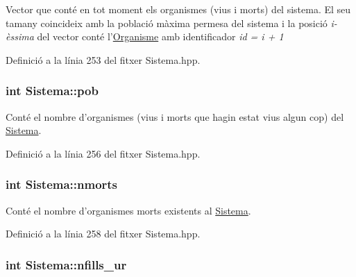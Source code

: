 Vector que conté en tot moment els organismes (vius i morts) del sistema. El seu tamany coincideix amb la població màxima permesa del sistema i la posició {\itshape i-\/èssima} del vector conté l'\hyperlink{class_organisme}{Organisme} amb identificador {\itshape id = i + 1} 



Definició a la línia 253 del fitxer Sistema.\-hpp.

\hypertarget{class_sistema_a5fe670604926861f960dfb33c80d45cf}{
\subsubsection[{pob}]{\setlength{\rightskip}{0pt plus 5cm}int Sistema\-::pob\hspace{0.3cm}{\ttfamily [private]}}}\label{class_sistema_a5fe670604926861f960dfb33c80d45cf}


Conté el nombre d'organismes (vius i morts que hagin estat vius algun cop) del \hyperlink{class_sistema}{Sistema}. 



Definició a la línia 256 del fitxer Sistema.\-hpp.

\hypertarget{class_sistema_a3ece5701abfce5aafee7c06a11e90573}{
\subsubsection[{nmorts}]{\setlength{\rightskip}{0pt plus 5cm}int Sistema\-::nmorts\hspace{0.3cm}{\ttfamily [private]}}}\label{class_sistema_a3ece5701abfce5aafee7c06a11e90573}


Conté el nombre d'organismes morts existents al \hyperlink{class_sistema}{Sistema}. 



Definició a la línia 258 del fitxer Sistema.\-hpp.

\hypertarget{class_sistema_aebdda1654fd616f76f03691926ecfb09}{
\subsubsection[{nfills\-\_\-ur}]{\setlength{\rightskip}{0pt plus 5cm}int Sistema\-::nfills\-\_\-ur\hspace{0.3cm}{\ttfamily [private]}}}\label{class_sistema_aebdda1654fd616f76f03691926ecfb09}


